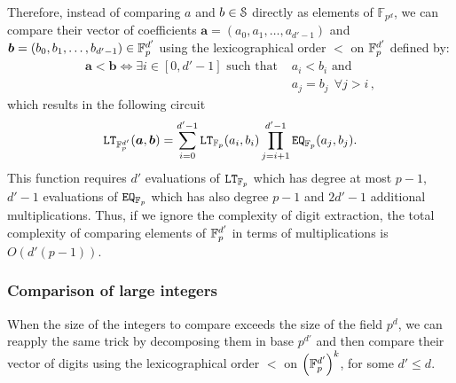   Therefore, instead of comparing $a$ and $b\in\S$ directly as elements of $\mathbb{F}_{p^d}$, we can compare their vector of coefficients $\bm{a} = (a_0,a_1,\ldots,a_{d'-1})$ and $\bm{b} = (b_0,b_1,\ldots,b_{d'-1}) \in \F_p^{d'}$ using the lexicographical order $\bm{<}$ on $\F_{p}^{d'}$ defined by:
   \begin{align*}
      \bm{a} \bm{<} \bm{b} \Leftrightarrow \exists i\in[0,d'-1] \text{ such that } & a_i < b_i \text{ and } \\
       & a_j = b_j ~~ \forall j > i \,,
    \end{align*}
    which results in the following circuit
    \begin{align*}
      \LT_{\F_p^{d'}}(\bm{a}, \bm{b}) = \sum_{i=0}^{d'-1} \LT_{\F_{p}}(a_{i}, b_{i}) \prod_{j=i+1}^{d'-1} \EQ_{\F_{p}}(a_{j}, b_{j}).
    \end{align*}
  This function requires $d'$ evaluations of $\LT_{\F_{p}}$ which has degree at most $p-1$, $d'-1$ evaluations of $\EQ_{\F_{p}}$ which has also degree $p-1$ and $2d'-1$ additional multiplications.
  Thus, if we ignore the complexity of digit extraction, the total complexity of comparing elements of $\F_{p}^{d'}$ in terms of multiplications is $O(d'(p-1))$.

\subsubsection{Comparison of large integers}\label{sec:comparison_of_large_integers}
When the size of the integers to compare exceeds the size of the field $p^d$, we can reapply the same trick by decomposing them in base $p^{d'}$ and then compare their vector of digits using the lexicographical order $\bm{<}$ on $\left(\F_{p}^{d'}\right)^k$, for some $d' \le d$.

